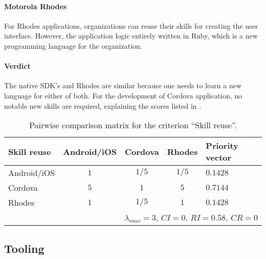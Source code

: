 \paragraph{Motorola Rhodes} For Rhodes applications, organizations can reuse their skills for creating the user interface. However, the application logic entirely written in Ruby, which is a new programming language for the organization.

\paragraph{Verdict} The native SDK's and Rhodes are similar because one needs to learn a new language for either of both. For the development of Cordova application, no notable new skills are required, explaining the scores listed in .



\begin{table}[h!]
    \begin{center}
        \begin{tabular}{lcccl}
            \hline
            \textbf{Skill reuse} & Android/iOS & Cordova & Rhodes & Priority vector \\
            \hline
            Android/iOS          & $1$         & $1/5$   & $1/5$  & $0.1428$        \\
            Cordova              & $5$         & $1$     & $5$    & $0.7144$        \\
            Rhodes               & $1$         & $1/5$   & $1$    & $0.1428$        \\
            \hline
            \multicolumn{5}{r}{$\lambda_{max} = 3$, $CI = 0$, $RI = 0.58$, $CR = 0$}\\
            \hline
        \end{tabular}
        \caption{Pairwise comparison matrix for the criterion ``Skill reuse''.}
        \label{tab:sr}
    \end{center}
\end{table}

\subsection{Tooling}

